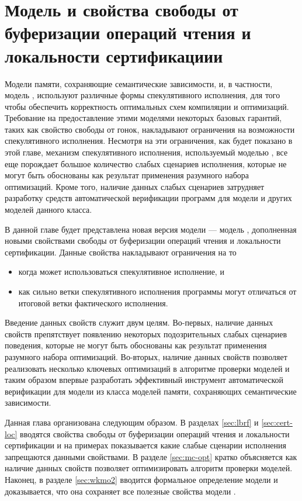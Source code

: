 \chapter{Модель \WkmS и свойства свободы от буферизации операций чтения и локальности сертификациии}
\label{ch:weakestmo2}

Модели памяти, сохраняющие семантические зависимости,
и, в частности, модель \Wkm, используют различные формы
спекулятивного исполнения, для того чтобы обеспечить
корректность оптимальных схем компиляции и оптимизаций.
Требование на предоставление этими моделями некоторых базовых гарантий,
таких как свойство свободы от гонок, накладывают
ограничения на возможности спекулятивного исполнения.
Несмотря на эти ограничения, как будет показано в этой главе,
механизм спекулятивного исполнения, используемый моделью \Wkm,
все еще порождает большое количество слабых сценариев исполнения,
которые не могут быть обоснованы как результат применения
разумного набора оптимизаций.
Кроме того, наличие данных слабых сценариев
затрудняет разработку средств автоматической верификации
программ для модели \Wkm и других моделей данного класса. 

В данной главе будет представлена новая версия модели \Wkm ---
модель \WkmS, дополненная новыми свойствами
свободы от буферизации операций чтения и локальности сертификации.
Данные свойства накладывают ограничения на то
\begin{itemize}
  \item когда может использоваться спекулятивное исполнение, и
  \item как сильно ветки спекулятивного исполнения программы 
    могут отличаться от итоговой ветки фактического исполнения. 
\end{itemize}
Введение данных свойств служит двум целям. 
Во-первых, наличие данных свойств препятствует появлению 
некоторых подозрительных слабых сценариев поведения, 
которые не могут быть обоснованы как результат применения
разумного набора оптимизаций. 
Во-вторых, наличие данных свойств позволяет реализовать 
несколько ключевых оптимизаций в алгоритме проверки моделей 
и таким образом впервые разработать эффективный инструмент
автоматической верификации для модели из класса 
моделей памяти, сохраняющих семантические зависимости. 

Данная глава организована следующим образом. 
В разделах \ref{sec:lbrf} и \ref{sec:cert-loc}
вводятся свойства свободы от буферизации операций чтения 
и локальности сертификации и на примерах показывается 
какие слабые сценарии исполнения запрещаются данными свойствами. 
В разделе \ref{sec:mc-opt} кратко объясняется как 
наличие данных свойств позволяет оптимизировать 
алгоритм проверки моделей. 
Наконец, в разделе \ref{sec:wkmo2} вводится 
формальное определение модели \WkmS 
и доказывается, что она сохраняет все полезные свойства модели \Wkm.

